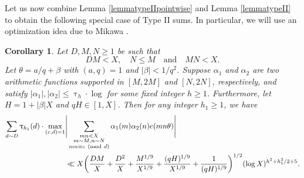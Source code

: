 \documentclass[12pt]{amsart}
\numberwithin{equation}{section}
\newtheorem{cor}[theorem]{Corollary}
\theoremstyle{remark}
\theoremstyle{definition}
\newcommand{\imod}[1]{\ (\mathrm{mod}\ #1)}
\begin{document}
Let us now combine Lemma \ref{lemmatypeIIpointwise} and Lemma \ref{lemmatypeII} to obtain the following special case of Type II sums. In particular, we will use an optimization idea due to Mikawa \cite{Mik}.


\begin{cor}\label{Cor: D}
Let $D, M, N\geq 1$ be such that 
\[DM<X, \quad N\leq M \quad \text{and} \quad MN<X.\] Let $\theta=a/q+\beta$ with $(a, q)=1$ and $|\beta|<1/q^2$. Suppose ${\alpha}_1$ and ${\alpha}_2$ are two arithmetic functions supported in $[M, 2M]$ and $[N, 2N]$, respectively, and satisfy $|{\alpha}_1|, |{\alpha}_2|\leq \uptau_h\cdot  \log$ for some fixed integer $h\geq 1$. Furthermore, let $H=1+|\beta|X$ and $qH\in [1, X]$. Then for any integer $h_1\geq 1$, we have
\begin{align}
\notag \sum_{\substack{d\sim D}}\uptau_{h_1}(d)\cdot\max_{(c, d)=1}&\Bigg\lvert\sum_{\substack{mn <X\\m\sim M, n\sim N\\mn\equiv c\imod d}}{\alpha}_1(m){\alpha}_2(n)e(mn\theta)\Bigg\rvert\\
\notag &\ll X\bigg(\dfrac{DM}{X} + \dfrac{D^2}{X} + \dfrac{M^{1/9}}{X^{1/9}}+ \dfrac{(qH)^{1/9}}{X^{1/9}} + \dfrac{1}{(qH)^{1/9}}\bigg)^{1/2}(\log X)^{h^2+h_1^2/2 + 5}.
\end{align}
\end{cor}
\end{document}
